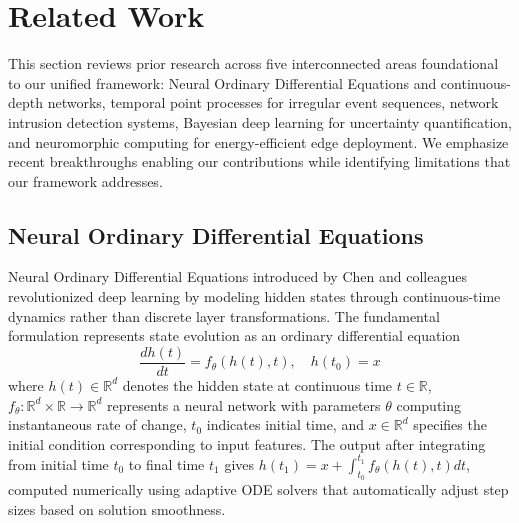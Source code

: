 \documentclass[10pt,journal,compsoc]{IEEEtran}
\newcommand{\R}{\mathbb{R}}
\begin{document}
\section{Related Work}
\label{sec:related}

This section reviews prior research across five interconnected areas foundational to our unified framework: Neural Ordinary Differential Equations and continuous-depth networks, temporal point processes for irregular event sequences, network intrusion detection systems, Bayesian deep learning for uncertainty quantification, and neuromorphic computing for energy-efficient edge deployment. We emphasize recent breakthroughs enabling our contributions while identifying limitations that our framework addresses.

\subsection{Neural Ordinary Differential Equations}

Neural Ordinary Differential Equations introduced by Chen and colleagues revolutionized deep learning by modeling hidden states through continuous-time dynamics rather than discrete layer transformations. The fundamental formulation represents state evolution as an ordinary differential equation
\begin{equation}
\frac{dh(t)}{dt} = f_\theta(h(t), t), \quad h(t_0) = x
\label{eq:node_basic}
\end{equation}
where $h(t) \in \R^d$ denotes the hidden state at continuous time $t \in \R$, $f_\theta: \R^d \times \R \to \R^d$ represents a neural network with parameters $\theta$ computing instantaneous rate of change, $t_0$ indicates initial time, and $x \in \R^d$ specifies the initial condition corresponding to input features. The output after integrating from initial time $t_0$ to final time $t_1$ gives $h(t_1) = x + \int_{t_0}^{t_1} f_\theta(h(t), t) dt$, computed numerically using adaptive ODE solvers that automatically adjust step sizes based on solution smoothness.
\end{document}
